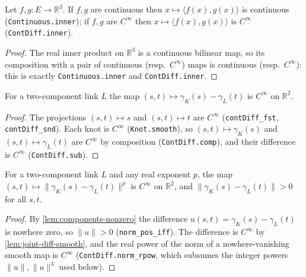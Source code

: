 \begin{lemma}
    \label{lem:inner-bilinear}
    \leanok
    Let $f,g : E\to\mathbb{R}^3$. If $f,g$ are continuous then
    $x\mapsto\langle f(x),g(x)\rangle$ is continuous (\texttt{Continuous.inner}); if
    $f,g$ are $C^\infty$ then $x\mapsto\langle f(x),g(x)\rangle$ is $C^\infty$
    (\texttt{ContDiff.inner}).
\end{lemma}
\begin{proof}
    The real inner product on $\mathbb{R}^3$ is a continuous bilinear map, so its
    composition with a pair of continuous (resp.\ $C^\infty$) maps is continuous
    (resp.\ $C^\infty$): this is exactly \texttt{Continuous.inner} and
    \texttt{ContDiff.inner}.
\end{proof}

\begin{lemma}
    \label{lem:joint-diff-smooth}
    \leanok
    For a two-component link $L$ the map $(s,t)\mapsto\gamma_K(s)-\gamma_L(t)$ is
    $C^\infty$ on $\mathbb{R}^2$.
\end{lemma}
\begin{proof}
    The projections $(s,t)\mapsto s$ and $(s,t)\mapsto t$ are $C^\infty$
    (\texttt{contDiff\_fst}, \texttt{contDiff\_snd}). Each knot is $C^\infty$
    (\texttt{Knot.smooth}), so $(s,t)\mapsto\gamma_K(s)$ and
    $(s,t)\mapsto\gamma_L(t)$ are $C^\infty$ by composition (\texttt{ContDiff.comp}),
    and their difference is $C^\infty$ (\texttt{ContDiff.sub}).
\end{proof}

\begin{lemma}
    \label{lem:joint-denom-pos}
    \leanok
    For a two-component link $L$ and any real exponent $p$, the map
    $(s,t)\mapsto\lVert\gamma_K(s)-\gamma_L(t)\rVert^{p}$ is $C^\infty$ on
    $\mathbb{R}^2$, and $\lVert\gamma_K(s)-\gamma_L(t)\rVert>0$ for all $s,t$.
\end{lemma}
\begin{proof}
    By \cref{lem:components-nonzero} the difference $u(s,t)=\gamma_K(s)-\gamma_L(t)$
    is nowhere zero, so $\lVert u\rVert>0$ (\texttt{norm\_pos\_iff}). The difference
    is $C^\infty$ by \cref{lem:joint-diff-smooth}, and the real power of the norm of a
    nowhere-vanishing smooth map is $C^\infty$ (\texttt{ContDiff.norm\_rpow}, which
    subsumes the integer powers $\lVert u\rVert,\lVert u\rVert^{3}$ used below).
\end{proof}

